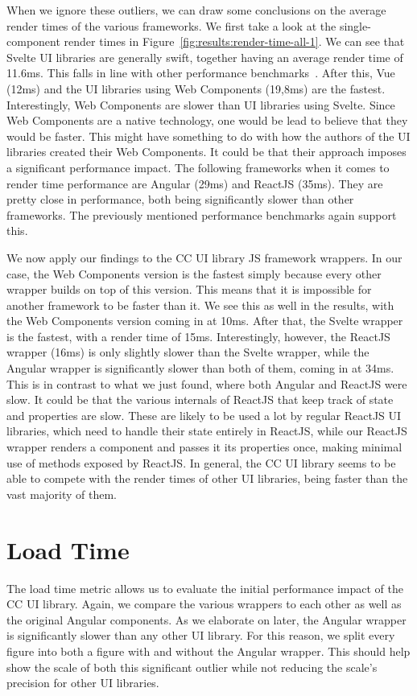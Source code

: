 When we ignore these outliers, we can draw some conclusions on the average render times of the various frameworks. We first take a look at the single-component render times in Figure~\ref{fig:results:render-time-all-1}. We can see that Svelte UI libraries are generally swift, together having an average render time of 11.6ms. This falls in line with other performance benchmarks~. After this, Vue (12ms) and the UI libraries using Web Components (19,8ms) are the fastest. Interestingly, Web Components are slower than UI libraries using Svelte. Since Web Components are a native technology, one would be lead to believe that they would be faster. This might have something to do with how the authors of the UI libraries created their Web Components. It could be that their approach imposes a significant performance impact. The following frameworks when it comes to render time performance are Angular (29ms) and ReactJS (35ms). They are pretty close in performance, both being significantly slower than other frameworks. The previously mentioned performance benchmarks again support this.

We now apply our findings to the CC UI library JS framework wrappers. In our case, the Web Components version is the fastest simply because every other wrapper builds on top of this version. This means that it is impossible for another framework to be faster than it. We see this as well in the results, with the Web Components version coming in at 10ms. After that, the Svelte wrapper is the fastest, with a render time of 15ms. Interestingly, however, the ReactJS wrapper (16ms) is only slightly slower than the Svelte wrapper, while the Angular wrapper is significantly slower than both of them, coming in at 34ms. This is in contrast to what we just found, where both Angular and ReactJS were slow. It could be that the various internals of ReactJS that keep track of state and properties are slow. These are likely to be used a lot by regular ReactJS UI libraries, which need to handle their state entirely in ReactJS, while our ReactJS wrapper renders a component and passes it its properties once, making minimal use of methods exposed by ReactJS. In general, the CC UI library seems to be able to compete with the render times of other UI libraries, being faster than the vast majority of them.

\section{Load Time}
The load time metric allows us to evaluate the initial performance impact of the CC UI library. Again, we compare the various wrappers to each other as well as the original Angular components. As we elaborate on later, the Angular wrapper is significantly slower than any other UI library. For this reason, we split every figure into both a figure with and without the Angular wrapper. This should help show the scale of both this significant outlier while not reducing the scale's precision for other UI libraries.


